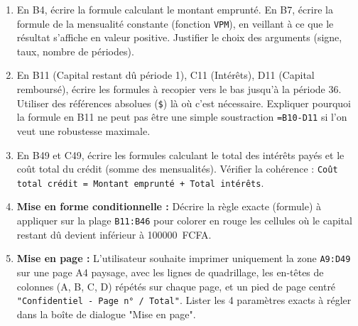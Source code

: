 \documentclass[11pt]{article}
\begin{document}
\begin{exercice}
\begin{enumerate}
    \item En B4, écrire la formule calculant le montant emprunté. En B7, écrire la formule de la mensualité constante (fonction \texttt{VPM}), en veillant à ce que le résultat s'affiche en valeur positive. Justifier le choix des arguments (signe, taux, nombre de périodes).
    \item En B11 (Capital restant dû période 1), C11 (Intérêts), D11 (Capital remboursé), écrire les formules à recopier vers le bas jusqu'à la période 36. Utiliser des références absolues (\texttt{\$}) là où c'est nécessaire. Expliquer pourquoi la formule en B11 ne peut pas être une simple soustraction \texttt{=B10-D11} si l'on veut une robustesse maximale.
    \item En B49 et C49, écrire les formules calculant le total des intérêts payés et le coût total du crédit (somme des mensualités). Vérifier la cohérence : \texttt{Coût total crédit = Montant emprunté + Total intérêts}.
    \item \textbf{Mise en forme conditionnelle :} Décrire la règle exacte (formule) à appliquer sur la plage \texttt{B11:B46} pour colorer en rouge les cellules où le capital restant dû devient inférieur à \SI{100 000}{FCFA}.
    \item \textbf{Mise en page :} L'utilisateur souhaite imprimer uniquement la zone \texttt{A9:D49} sur une page A4 paysage, avec les lignes de quadrillage, les en-têtes de colonnes (A, B, C, D) répétés sur chaque page, et un pied de page centré \texttt{"Confidentiel - Page n° / Total"}. Lister les 4 paramètres exacts à régler dans la boîte de dialogue "Mise en page".
\end{enumerate}
\end{exercice}
\end{document}
